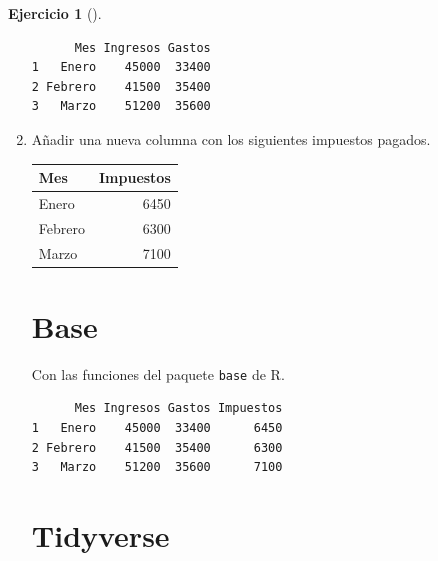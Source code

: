 \documentclass[
  a4paper,
]{scrreport}
\newenvironment{Shaded}{\begin{snugshade}}{\end{snugshade}}
\newcommand{\DecValTok}[1]{\textcolor[rgb]{0.68,0.00,0.00}{#1}}
\newcommand{\FunctionTok}[1]{\textcolor[rgb]{0.28,0.35,0.67}{#1}}
\newcommand{\NormalTok}[1]{\textcolor[rgb]{0.00,0.23,0.31}{#1}}
\newcommand{\OtherTok}[1]{\textcolor[rgb]{0.00,0.23,0.31}{#1}}
\newcommand{\SpecialCharTok}[1]{\textcolor[rgb]{0.37,0.37,0.37}{#1}}
\theoremstyle{definition}
\newtheorem{exercise}{Ejercicio}[chapter]
\theoremstyle{remark}
\begin{document}
\begin{exercise}[]
\begin{enumerate}
\begin{tcolorbox}
\begin{verbatim}
      Mes Ingresos Gastos
1   Enero    45000  33400
2 Febrero    41500  35400
3   Marzo    51200  35600
\end{verbatim}

  \end{tcolorbox}
\item
  Añadir una nueva columna con los siguientes impuestos pagados.

  \begin{longtable*}[t]{lr}
  \toprule
  Mes & Impuestos\\
  \midrule
  Enero & 6450\\
  Febrero & 6300\\
  Marzo & 7100\\
  \bottomrule
  \end{longtable*}

  \begin{tcolorbox}[enhanced jigsaw, breakable, toptitle=1mm, colbacktitle=quarto-callout-tip-color!10!white, rightrule=.15mm, opacityback=0, opacitybacktitle=0.6, titlerule=0mm, coltitle=black, colframe=quarto-callout-tip-color-frame, colback=white, bottomtitle=1mm, leftrule=.75mm, toprule=.15mm, title=\textcolor{quarto-callout-tip-color}{\faLightbulb}\hspace{0.5em}{Solución}, arc=.35mm, bottomrule=.15mm, left=2mm]

  \section{Base}

  Con las funciones del paquete \texttt{base} de R.

\begin{Shaded}
\end{Shaded}

\begin{verbatim}
      Mes Ingresos Gastos Impuestos
1   Enero    45000  33400      6450
2 Febrero    41500  35400      6300
3   Marzo    51200  35600      7100
\end{verbatim}

  \section{Tidyverse}


\end{tcolorbox}
\end{enumerate}
\end{exercise}
\end{document}
